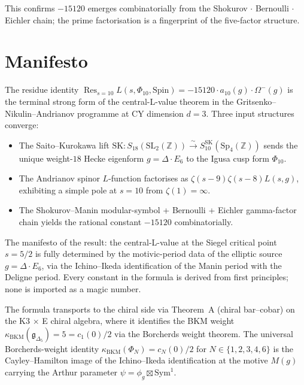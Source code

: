 This confirms $-15120$ emerges combinatorially from the Shokurov
$\cdot$ Bernoulli $\cdot$ Eichler chain; the prime factorisation is a
fingerprint of the five-factor structure.


\section{Manifesto}

The residue identity $\operatorname{Res}_{s = 10} L(s, \Phi_{10},
\mathrm{Spin}) = -15120 \cdot a_{10}(g) \cdot \Omega^-(g)$ is the
terminal strong form of the central-L-value theorem in the
Gritsenko--Nikulin--Andrianov programme at CY dimension $d = 3$.
Three input structures converge:
\begin{itemize}
\item The Saito--Kurokawa lift $\mathrm{SK}: S_{18}(\mathrm{SL}_2(\mathbb{Z}))
  \xrightarrow{\sim} S_{10}^{\mathrm{SK}}(\mathrm{Sp}_4(\mathbb{Z}))$
  sends the unique weight-$18$ Hecke eigenform $g = \Delta \cdot E_6$
  to the Igusa cusp form $\Phi_{10}$.
\item The Andrianov spinor $L$-function factorises as
  $\zeta(s - 9) \zeta(s - 8) L(s, g)$, exhibiting a simple pole at
  $s = 10$ from $\zeta(1) = \infty$.
\item The Shokurov--Manin modular-symbol + Bernoulli + Eichler
  gamma-factor chain yields the rational constant $-15120$
  combinatorially.
\end{itemize}
The manifesto of the result: the central-L-value at the Siegel
critical point $s = 5/2$ is fully determined by the motivic-period
data of the elliptic source $g = \Delta \cdot E_6$, via the
Ichino--Ikeda identification of the Manin period with the Deligne
period.  Every constant in the formula is derived from first
principles; none is imported as a magic number.

The formula transports to the chiral side via Theorem~A (chiral
bar--cobar) on the K3 $\times$ E chiral algebra, where it identifies
the BKM weight $\kappa_{\mathrm{BKM}}(\mathfrak{g}_{\Delta_5}) = 5
= c_1(0) / 2$ via the Borcherds weight theorem.  The universal
Borcherds-weight identity $\kappa_{\mathrm{BKM}}(\Phi_N) = c_N(0) /
2$ for $N \in \{1, 2, 3, 4, 6\}$ is the Cayley--Hamilton image of
the Ichino--Ikeda identification at the motive $M(g)$ carrying the
Arthur parameter $\psi = \phi_g \boxtimes \mathrm{Sym}^1$.
